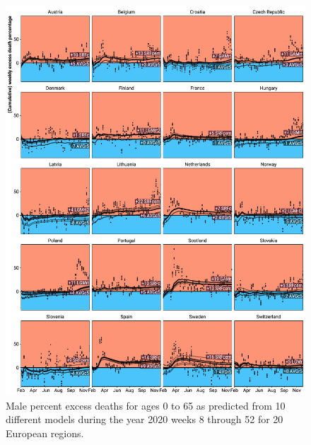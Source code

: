 \documentclass[12pt]{article}
\begin{document}
\begin{appendix}
\begin{figure}
\caption{
Male percent excess deaths for ages 0 to 65 as predicted from 10 different models during the year 2020 weeks 8 through 52 for 20 European regions.}
\label{fig:excessm0to65}
\includegraphics{excess_male__0_65_.pdf}
\end{figure}


\end{appendix}
\end{document}
